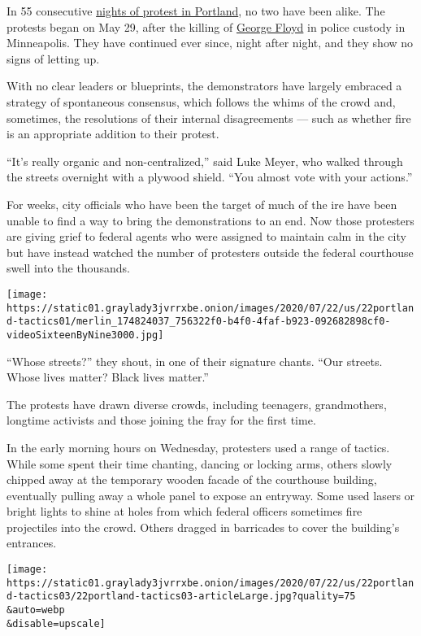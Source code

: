 In 55 consecutive
\href{https://www.nytimes3xbfgragh.onion/2020/07/23/upshot/trump-portland.html}{nights
of protest in Portland}, no two have been alike. The protests began on
May 29, after the killing of
\href{https://www.nytimes3xbfgragh.onion/article/george-floyd-who-is.html}{George
Floyd} in police custody in Minneapolis. They have continued ever since,
night after night, and they show no signs of letting up.

With no clear leaders or blueprints, the demonstrators have largely
embraced a strategy of spontaneous consensus, which follows the whims of
the crowd and, sometimes, the resolutions of their internal
disagreements --- such as whether fire is an appropriate addition to
their protest.

``It's really organic and non-centralized,'' said Luke Meyer, who walked
through the streets overnight with a plywood shield. ``You almost vote
with your actions.''

For weeks, city officials who have been the target of much of the ire
have been unable to find a way to bring the demonstrations to an end.
Now those protesters are giving grief to federal agents who were
assigned to maintain calm in the city but have instead watched the
number of protesters outside the federal courthouse swell into the
thousands.

\texttt{[image: https://static01.graylady3jvrrxbe.onion/images/2020/07/22/us/22portland-tactics01/merlin\_174824037\_756322f0-b4f0-4faf-b923-092682898cf0-videoSixteenByNine3000.jpg]}

``Whose streets?'' they shout, in one of their signature chants. ``Our
streets. Whose lives matter? Black lives matter.''

The protests have drawn diverse crowds, including teenagers,
grandmothers, longtime activists and those joining the fray for the
first time.

In the early morning hours on Wednesday, protesters used a range of
tactics. While some spent their time chanting, dancing or locking arms,
others slowly chipped away at the temporary wooden facade of the
courthouse building, eventually pulling away a whole panel to expose an
entryway. Some used lasers or bright lights to shine at holes from which
federal officers sometimes fire projectiles into the crowd. Others
dragged in barricades to cover the building's entrances.

\texttt{[image: https://static01.graylady3jvrrxbe.onion/images/2020/07/22/us/22portland-tactics03/22portland-tactics03-articleLarge.jpg?quality=75\\\&auto=webp\\\&disable=upscale]}

